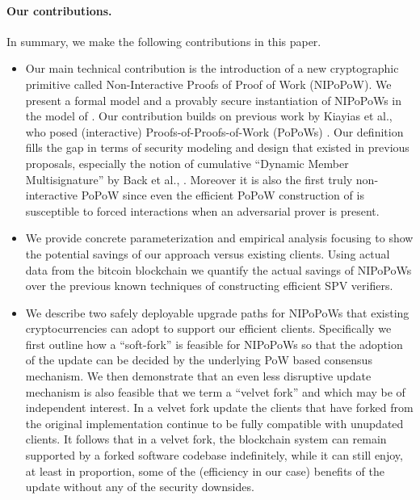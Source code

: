 \paragraph{Our contributions.}
In summary,  we make the following contributions in this paper.
  \begin{itemize}
    \item Our main technical contribution is the introduction of
    a new cryptographic
     primitive called Non-Interactive Proofs of Proof of Work (NIPoPoW). We present a formal model and a provably secure
     instantiation of NIPoPoWs in the model of \cite{backbone}.
     Our contribution builds on previous work by  Kiayias et al., who posed
     (interactive) Proofs-of-Proofs-of-Work (PoPoWs) \cite{KLS}.
     Our definition fills the gap in terms of security modeling and design that
      existed in previous proposals, especially the notion of cumulative
      ``Dynamic Member Multisignature'' by Back et al., \cite{}. Moreover
      it is also the first truly non-interactive PoPoW since even the
      efficient PoPoW construction of \cite{KLS} is susceptible to forced
      interactions when an adversarial prover is present.

  \item We provide concrete parameterization and empirical analysis focusing to show the potential savings of our approach versus existing clients.
Using actual data from the bitcoin blockchain we quantify the actual savings of NIPoPoWs over
the previous known techniques of constructing efficient SPV verifiers.
   \item We describe two safely deployable upgrade paths for NIPoPoWs that existing cryptocurrencies can  adopt to support our efficient clients. Specifically
   we first outline how a ``soft-fork''  is feasible for NIPoPoWs so that the
   adoption of the update can be decided by the underlying PoW based consensus mechanism. We then demonstrate that an even less disruptive update mechanism is also feasible that we term a ``velvet fork'' and which may be of independent interest. In a velvet fork update the clients that have forked from the original implementation continue to be fully compatible with unupdated clients. It follows that in a velvet fork, the blockchain system can remain supported by a forked software codebase indefinitely, while it can still enjoy, at least in proportion, some of the (efficiency in our case) benefits of the update without any of the  security downsides.
  \end{itemize}

